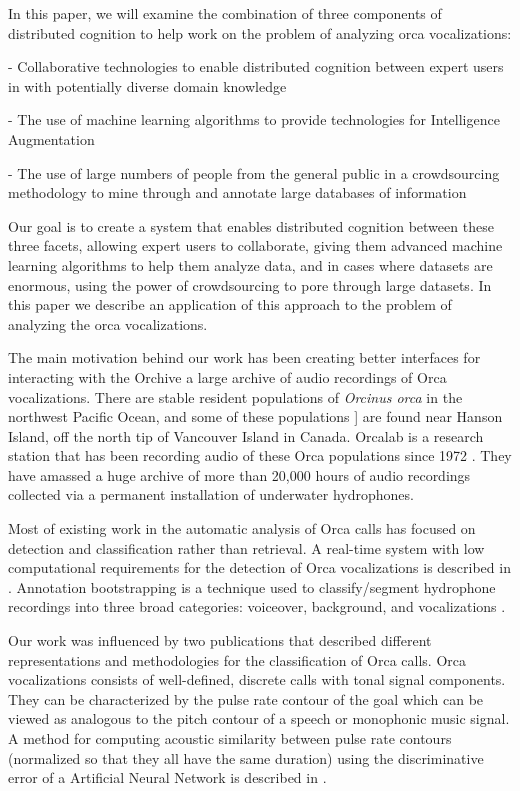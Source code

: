 In this paper, we will examine the combination of three components of
distributed cognition to help work on the problem of analyzing orca
vocalizations:

- Collaborative technologies to enable distributed cognition between
expert users in with potentially diverse domain knowledge

- The use of machine learning algorithms to provide technologies for
Intelligence Augmentation

- The use of large numbers of people from the general public in a
crowdsourcing methodology to mine through and annotate large databases
of information

Our goal is to create a system that enables distributed cognition
between these three facets, allowing expert users to collaborate,
giving them advanced machine learning algorithms to help them analyze
data, and in cases where datasets are enormous, using the power of
crowdsourcing to pore through large datasets.  In this paper we
describe an application of this approach to the problem of analyzing
the orca vocalizations.

The main motivation behind our work has been creating better
interfaces for interacting with the Orchive \cite{tzanetakis07} a
large archive of audio recordings of Orca vocalizations.  There are
stable resident populations of \textit{Orcinus orca} in the
northwest Pacific Ocean, and some of these populations \cite{ford00}]
are found near Hanson Island, off the north tip of Vancouver Island in
Canada. Orcalab is a research station that has been recording audio of
these Orca populations since 1972
\cite{deecke99}. They have amassed a huge archive of
more than 20,000 hours of audio recordings collected via a permanent
installation of underwater hydrophones.

Most of existing work in the automatic analysis of Orca calls has
focused on detection and classification rather than retrieval. A
real-time system with low computational requirements for the detection
of Orca vocalizations is described in \cite{Luke2010771}. Annotation
bootstrapping is a technique used to classify/segment hydrophone
recordings into three broad categories: voiceover, background, and
vocalizations \cite{ness08}. 

Our work was influenced by two publications that described different 
representations and methodologies for the classification of Orca
calls. Orca vocalizations consists of well-defined, discrete calls
with tonal signal components. They can be characterized by the pulse
rate contour of the goal which can be viewed as analogous to the pitch
contour of a speech or monophonic music signal. A method for computing 
acoustic similarity between pulse rate contours (normalized so that
they all have the same duration) using the discriminative error of a
Artificial Neural Network is described in
\cite{deecke99}. 

